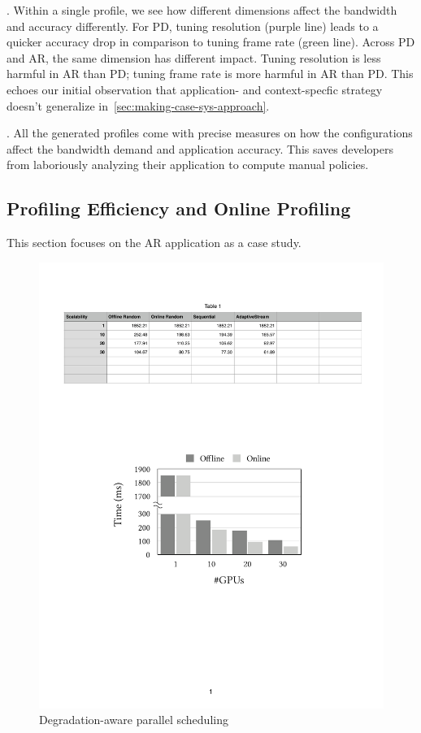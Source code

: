 . Within a single profile, we see how
different dimensions affect the bandwidth and accuracy differently. For PD,
tuning resolution (purple line) leads to a quicker accuracy drop in comparison
to tuning frame rate (green line). Across PD and AR, the same dimension has
different impact. Tuning resolution is less harmful in AR than PD; tuning frame
rate is more harmful in AR than PD. This echoes our initial observation that
application- and context-specfic strategy doesn't generalize
in~\autoref{sec:making-case-sys-approach}.

. All the generated profiles come with
precise measures on how the configurations affect the bandwidth demand and
application accuracy. This saves developers from laboriously analyzing their
application to compute manual policies.

\newpage

\subsection{Profiling Efficiency and Online Profiling}
\label{sec:online-profiling}

This section focuses on the AR application as a case study.

\begin{figure}
  \centering
  \includegraphics[width=0.8\columnwidth]{figures/parallel.pdf}
  \caption{Degradation-aware parallel scheduling}
  \label{fig:parallel}
\end{figure}

